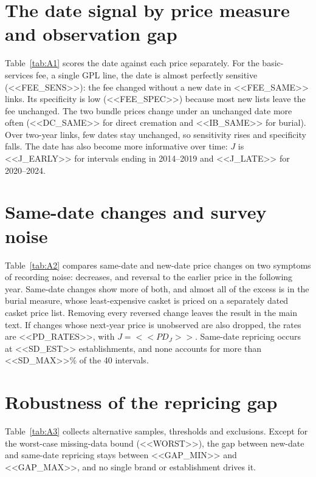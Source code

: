 \section{The date signal by price measure and observation gap}
Table~\ref{tab:A1} scores the date against each price separately. For the basic-services fee, a single GPL line, the date is almost perfectly sensitive (<<FEE_SENS>>): the fee changed without a new date in <<FEE_SAME>> links. Its specificity is low (<<FEE_SPEC>>) because most new lists leave the fee unchanged. The two bundle prices change under an unchanged date more often (<<DC_SAME>> for direct cremation and <<IB_SAME>> for burial). Over two-year links, few dates stay unchanged, so sensitivity rises and specificity falls. The date has also become more informative over time: $J$ is <<J_EARLY>> for intervals ending in 2014--2019 and <<J_LATE>> for 2020--2024.



\section{Same-date changes and survey noise}
Table~\ref{tab:A2} compares same-date and new-date price changes on two symptoms of recording noise: decreases, and reversal to the earlier price in the following year. Same-date changes show more of both, and almost all of the excess is in the burial measure, whose least-expensive casket is priced on a separately dated casket price list. Removing every reversed change leaves the result in the main text. If changes whose next-year price is unobserved are also dropped, the rates are <<PD_RATES>>, with $J=<<PD_J>>$. Same-date repricing occurs at <<SD_EST>> establishments, and none accounts for more than <<SD_MAX>>\% of the 40 intervals.



\section{Robustness of the repricing gap}
Table~\ref{tab:A3} collects alternative samples, thresholds and exclusions. Except for the worst-case missing-data bound (<<WORST>>), the gap between new-date and same-date repricing stays between <<GAP_MIN>> and <<GAP_MAX>>, and no single brand or establishment drives it.



